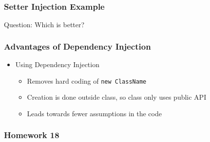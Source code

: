 \hypertarget{setter-injection-example}{%
\subsubsection{Setter Injection
Example}\label{setter-injection-example}}

\begin{Shaded}
\begin{Highlighting}[]

\NormalTok{\};}

\NormalTok{:}
\NormalTok{  \{}
\NormalTok{  \}}

\NormalTok{:}
\NormalTok{;}
\NormalTok{\};}

\NormalTok{\{}
\NormalTok{\}}

\end{Highlighting}
\end{Shaded}

Question: Which is better?

\hypertarget{advantages-of-dependency-injection}{%
\subsubsection{Advantages of Dependency
Injection}\label{advantages-of-dependency-injection}}

\begin{itemize}
\tightlist
\item
  Using Dependency Injection

  \begin{itemize}
  \tightlist
  \item
    Removes hard coding of \texttt{new\ ClassName}
  \item
    Creation is done outside class, so class only uses public API
  \item
    Leads towards fewer assumptions in the code
  \end{itemize}
\end{itemize}

\hypertarget{homework-18}{%
\subsubsection{Homework 18}\label{homework-18}}

